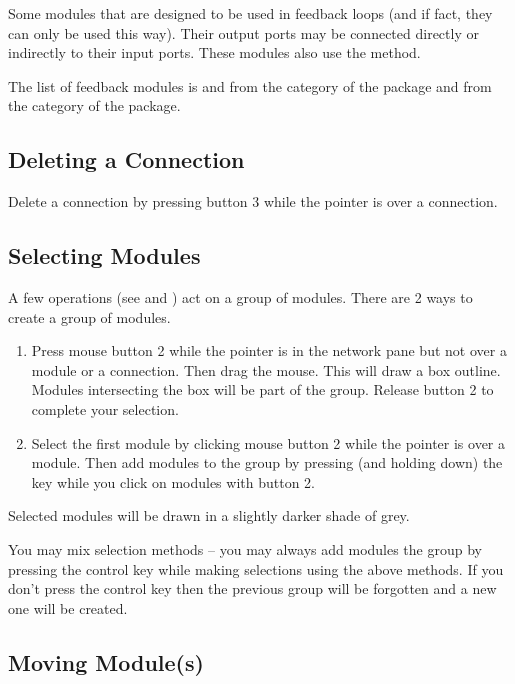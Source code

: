 Some modules that are designed to be used in feedback loops (and if fact,
they can only be used this way).  Their output ports may be connected
directly or indirectly to their input ports.  These modules also use the
 method.

The list of feedback modules is  and
 from the  category of the
 package and  from the
 category of the  package.

\subsection{Deleting a Connection}
\label{sec:deleteconnections}

Delete a connection by pressing button 3 while the pointer is
over a connection.

\subsection{Selecting Modules}
\label{sec:selectmods}

A few operations (see  and
) act on a group of
modules.  There are 2 ways to create a group of modules.

\begin{enumerate}
\item Press mouse button 2 while the pointer is in the network pane but not over
a module or a connection.  Then drag the mouse.  This will draw a box
outline.  Modules intersecting the box will be part of the group.  Release
button 2 to complete your selection.
\item Select the first module by clicking mouse button 2 while the pointer is
over a module.  Then add modules to the group by pressing (and holding
down) the  key while you click on modules with button 2.
\end{enumerate}

Selected modules will be drawn in a slightly darker shade of grey.

You may mix selection methods -- you may always add modules the group by
pressing the control key while making selections using the above methods.
If you don't press the control key then the previous group will be
forgotten and a new one will be created.

\subsection{Moving Module(s)}
\label{sec:movemod}

